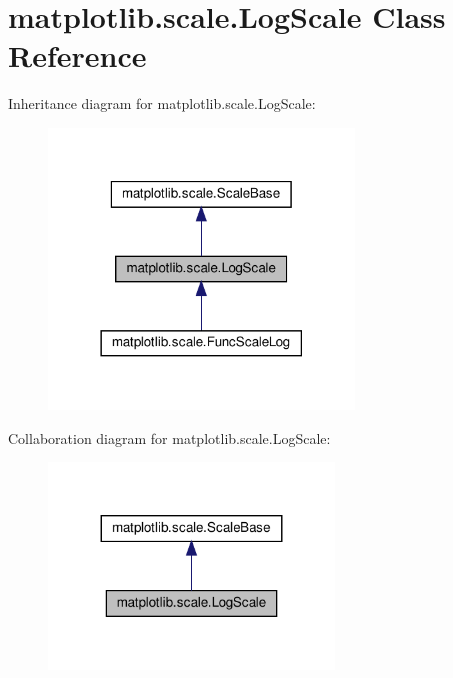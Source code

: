 \hypertarget{classmatplotlib_1_1scale_1_1LogScale}{}\section{matplotlib.\+scale.\+Log\+Scale Class Reference}
\label{classmatplotlib_1_1scale_1_1LogScale}


Inheritance diagram for matplotlib.\+scale.\+Log\+Scale\+:
\nopagebreak
\begin{figure}[H]
\begin{center}
\leavevmode
\includegraphics[width=230pt]{classmatplotlib_1_1scale_1_1LogScale__inherit__graph}
\end{center}
\end{figure}


Collaboration diagram for matplotlib.\+scale.\+Log\+Scale\+:
\nopagebreak
\begin{figure}[H]
\begin{center}
\leavevmode
\includegraphics[width=215pt]{classmatplotlib_1_1scale_1_1LogScale__coll__graph}
\end{center}
\end{figure}
